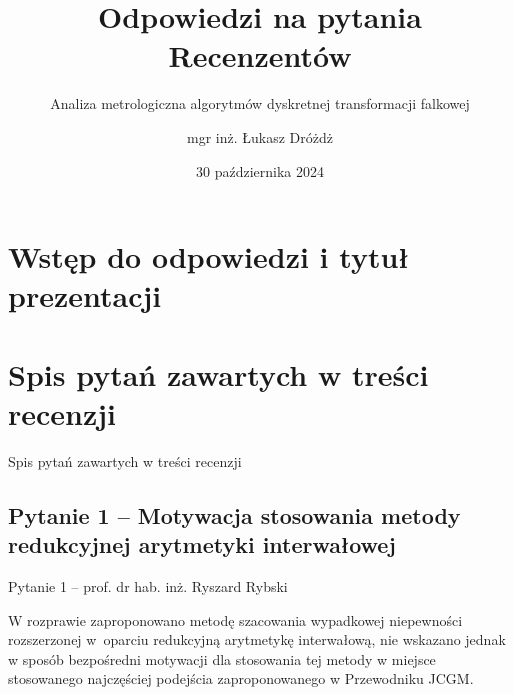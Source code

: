 \documentclass[12pt, polish, aspectratio = 169]{slides}
\title{Odpowiedzi na pytania Recenzentów}
\author{mgr inż. Łukasz Dróżdż}
\subtitle{Analiza metrologiczna algorytmów dyskretnej transformacji falkowej}
\institute{Politechnika Śląska, Wydział Elektryczny \\ Katedra Metrologii, Elektroniki i Automatyki}
\date{30 października 2024}
\begin{document}
\section*{Wstęp do odpowiedzi i tytuł prezentacji}

\begin{frame}[plain]
\titlepage
\end{frame}

\section*{Spis pytań zawartych w treści recenzji}

\begin{frame}{Spis pytań zawartych w treści recenzji}
\tableofcontents
\end{frame}


\subsection{Pytanie 1 -- Motywacja stosowania metody redukcyjnej arytmetyki interwałowej}

\begin{frame}{Pytanie 1 -- prof. dr hab. inż. Ryszard Rybski}\large
\begin{justify}
W rozprawie zaproponowano metodę szacowania wypadkowej niepewności rozszerzonej w oparciu redukcyjną arytmetykę interwałową, nie wskazano jednak w sposób bezpośredni motywacji dla stosowania tej metody w miejsce stosowanego najczęściej podejścia zaproponowanego w Przewodniku JCGM.
\end{justify}
\end{frame}
\end{document}
